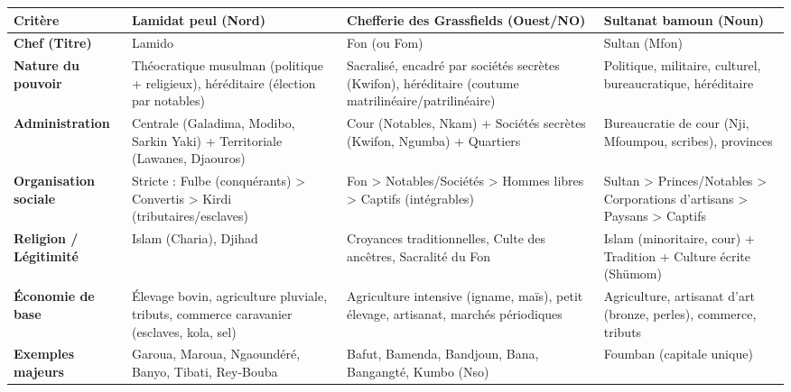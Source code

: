 \documentclass[11pt]{article}
\begin{document}
\begin{center}
\begin{tabularx}{\linewidth}{|l|X|X|X|}
\hline
\rowcolor{popblueL} \textbf{Critère} & \textbf{Lamidat peul (Nord)} & \textbf{Chefferie des Grassfields (Ouest/NO)} & \textbf{Sultanat bamoun (Noun)} \\
\hline
\textbf{Chef (Titre)} & Lamido & Fon (ou Fom) & Sultan (Mfon) \\
\hline
\textbf{Nature du pouvoir} & Théocratique musulman (politique + religieux), héréditaire (élection par notables) & Sacralisé, encadré par sociétés secrètes (Kwifon), héréditaire (coutume matrilinéaire/patrilinéaire) & Politique, militaire, culturel, bureaucratique, héréditaire \\
\hline
\textbf{Administration} & Centrale (Galadima, Modibo, Sarkin Yaki) + Territoriale (Lawanes, Djaouros) & Cour (Notables, Nkam) + Sociétés secrètes (Kwifon, Ngumba) + Quartiers & Bureaucratie de cour (Nji, Mfoumpou, scribes), provinces \\
\hline
\textbf{Organisation sociale} & Stricte : Fulbe (conquérants) > Convertis > Kirdi (tributaires/esclaves) & Fon > Notables/Sociétés > Hommes libres > Captifs (intégrables) & Sultan > Princes/Notables > Corporations d'artisans > Paysans > Captifs \\
\hline
\textbf{Religion / Légitimité} & Islam (Charia), Djihad & Croyances traditionnelles, Culte des ancêtres, Sacralité du Fon & Islam (minoritaire, cour) + Tradition + Culture écrite (Shümom) \\
\hline
\textbf{Économie de base} & Élevage bovin, agriculture pluviale, tributs, commerce caravanier (esclaves, kola, sel) & Agriculture intensive (igname, maïs), petit élevage, artisanat, marchés périodiques & Agriculture, artisanat d'art (bronze, perles), commerce, tributs \\
\hline
\textbf{Exemples majeurs} & Garoua, Maroua, Ngaoundéré, Banyo, Tibati, Rey-Bouba & Bafut, Bamenda, Bandjoun, Bana, Bangangté, Kumbo (Nso) & Foumban (capitale unique) \\
\hline
\end{tabularx}
\end{center}
\end{document}
